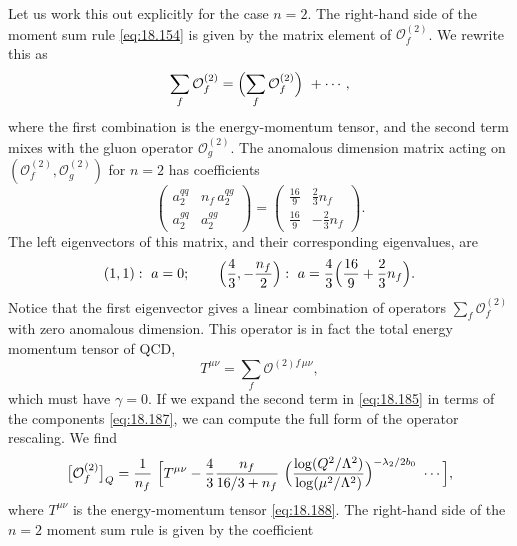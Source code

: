 Let us work this out explicitly for the case $n = 2$.  The right-hand side
of the moment sum rule \eqref{eq:18.154} is given by the matrix element of
$\mathcal{O}^{(2)}_f$.  We rewrite this as
\begin{equation}
  \sum_f \mathcal{O}^{(2)}_f = \Bigl( \sum_f \mathcal{O}^{(2)}_f \Bigr)\
    + \cdots ,
  \label{eq:18.185}
\end{equation}
where the first combination is the energy-momentum tensor, and the second
term mixes with the gluon operator $\mathcal{O}^{(2)}_g$.  The anomalous
dimension matrix acting on $(\mathcal{O}^{(2)}_f, \mathcal{O}^{(2)}_g)$ for
$n = 2$ has coefficients
\begin{equation}
  \begin{pmatrix}
    a_2^{qq} & n_f\,a_2^{qg}\\
    a_2^{gq} & a_2^{gg}
  \end{pmatrix}
  = \begin{pmatrix}
    \frac{16}{9} & \frac{2}{3}n_f\\
    \frac{16}{9} & -\frac{2}{3}n_f
  \end{pmatrix} .
  \label{eq:18.186}
\end{equation}
The left eigenvectors of this matrix, and their corresponding eigenvalues,
are
\begin{equation}
  (1, 1):\ a = 0;\qquad
  \Bigl( \frac{4}{3}, -\frac{n_f}{2} \Bigr):\ a = \frac{4}{3}\Bigl(
    \frac{16}{9} + \frac{2}{3}n_f \Bigr) .
  \label{eq:18.187}
\end{equation}
Notice that the first eigenvector gives a linear combination of operators
$\sum_f\mathcal{O}^{(2)}_f$ with zero anomalous dimension.  This operator is
in fact the total energy momentum tensor of QCD,
\begin{equation}
  T^{\mu\nu} = \sum_f \mathcal{O}^{(2)f\,\mu\nu} ,
  \label{eq:18.188}
\end{equation}
which must have $\gamma = 0$.  If we expand the second term in
\eqref{eq:18.185} in terms of the components \eqref{eq:18.187}, we can
compute the full form of the operator rescaling.  We find
\begin{equation}
  \bigl[ \mathcal{O}^{(2)}_f \bigr]_Q = \frac{1}{n_f}\ \Bigl[
    T^{\mu\nu} - \frac{4}{3}\frac{n_f}{16/3+n_f}\ \Bigl( \frac{\log(Q^2/
      \Lambda^2)}{\log(\mu^2/\Lambda^2)} \Bigr)^{-\lambda_2/2b_0}\ \cdots
    \Bigr] ,
  \label{eq:18.189}
\end{equation}
where $T^{\mu\nu}$ is the energy-momentum tensor \eqref{eq:18.188}.  The
right-hand side of the $n = 2$ moment sum rule is given by the coefficient
